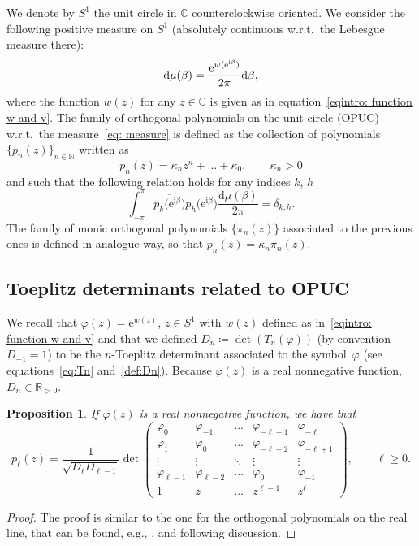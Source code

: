 \documentclass[pdftex]{sigma}%
\numberwithin{equation}{section}
\newtheorem{Proposition}[Theorem]{Proposition}
 { \theoremstyle{definition}
\newtheorem{Definition}[Theorem]{Definition}
\newtheorem{Note}[Theorem]{Note}
\newtheorem{Example}[Theorem]{Example}
\newtheorem{problem}[Theorem]{Riemann--Hilbert Problem}
\newtheorem{Remark}[Theorem]{Remark} }
\def\e{\mathrm{e}}
\newcommand{\C}{\mathbb{C}}
\newcommand{\N}{\mathbb{N}}
\def\d{\mathrm{d}}
\def\i{\mathrm{i}}
\begin{document}
We denote by	$S^1$ the unit circle in $\C$ counterclockwise oriented.
	We consider the following positive measure on $S^1$ (absolutely continuous w.r.t.\ the Lebesgue measure there):
	\begin{equation}
		\label{eq: measure}
		\d\mu(\beta) = \frac{\e^{w(\e^{{\rm i}\beta})}}{2\pi}\d\beta,
	\end{equation}
	where the function $w(z)$ for any $z\in \mathbb{C}$ is given as in equation~\eqref{eqintro: function w and v}.
	The family of orthogonal polynomials on the unit circle (OPUC) w.r.t.\ the measure~\eqref{eq: measure} is defined as the collection of polynomials $\lbrace p_n(z) \rbrace_{n \in \N}$ written as
	\begin{equation}\label{eq: n th opuc}
		p_n(z)=\kappa_{n}z^n + \dots +\kappa_0, \qquad
\kappa_n >0
	\end{equation}
	and such that the following relation holds for any indices $k$, $h$
	\begin{equation*}
		\int_{-\pi}^{\pi} \overline{p_k\big (\e^{\i\beta}\big)}p_h\big(\e^{\i\beta}\big)\frac{\d \mu(\beta)}{2\pi}=\delta_{k,h}.
	\end{equation*}
	The family of monic orthogonal polynomials $\lbrace\pi_n(z)\rbrace$ associated to the previous ones is defined in analogue way, so that $p_n(z)=\kappa_{n}\pi_n(z)$.
	
	\subsection{Toeplitz determinants related to OPUC}
	We recall that $\varphi(z)=\e^{w(z)}$, $z\in S^1$ with $w(z)$ defined as in~\eqref{eqintro: function w and v} and
 that we defined $D_n \coloneqq \det (T_n(\varphi))$ (by convention $D_{-1}=1$) to be the $n$-Toeplitz determinant associated to the symbol~$\varphi$ (see equations~\eqref{eq:Tn} and~\eqref{def:Dn}). Because $\varphi(z)$ is a real nonnegative function, $D_n \in \mathbb{R}_{>0}$.
	\begin{Proposition}
		If $\varphi(z)$ is a real nonnegative function, we have that
		\begin{equation}
			\label{eq:OPUC in Toeplitz form}
			p_\ell(z)=\frac{1}{\sqrt{D_\ell D_{\ell-1}}}\det\begin{pmatrix}
				\varphi_0 & \varphi_{-1} & \dots & \varphi_{-\ell+1}&\varphi_{-\ell}\\
				\varphi_1& \varphi_0 & \dots & \varphi_{-\ell+2} & \varphi_{-\ell+1}\\
				\vdots& \vdots & \ddots & \vdots &\vdots\\
				\varphi_{\ell-1}& \varphi_{\ell-2}& \dots & \varphi_0 &\varphi_{-1}\\
				1 &z &\dots &z^{\ell-1}& z^\ell
			\end{pmatrix}\!, \qquad
\ell\geq 0.
		\end{equation}
	\end{Proposition}
	\begin{proof}
		The proof is similar to the one for the orthogonal polynomials on the real line, that can be found, e.g., \cite[equation~(3.5)]{DeiftOPRM}, and following discussion.
	\end{proof}
\end{document}
